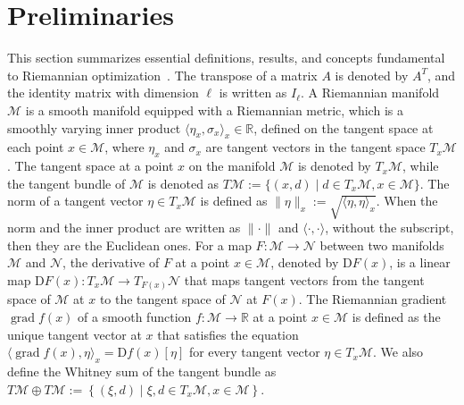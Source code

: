 \documentclass[pdflatex,sn-mathphys-num]{sn-jnl}%
\theoremstyle{definition} %
\theoremstyle{remark} %
\begin{document}
\section{Preliminaries}\label{sec: preliminaries}

This section summarizes essential definitions, results, and concepts fundamental to Riemannian optimization~\cite{sato_riemannian_2021}.
The transpose of a matrix $A$ is denoted by $A^T$, and the identity matrix with dimension $\ell$ is written as $I_\ell$.
A Riemannian manifold \(\mathcal{M}\) is a smooth manifold equipped with a Riemannian metric, which is a smoothly varying inner product \(\langle \eta_x, \sigma_x \rangle_x \in \mathbb{R}\), defined on the tangent space at each point \(x \in \mathcal{M}\), where \(\eta_x\) and \(\sigma_x\) are tangent vectors in the tangent space \(T_x \mathcal{M}\).
The tangent space at a point \(x\) on the manifold \(\mathcal{M}\) is denoted by \(T_x \mathcal{M}\), while the tangent bundle of \(\mathcal{M}\) is denoted as \(T\mathcal{M} := \{(x, d) \mid d \in T_x \mathcal{M}, x \in \mathcal{M}\}\).
The norm of a tangent vector \(\eta \in T_x \mathcal{M}\) is defined as \(\|\eta\|_x := \sqrt{\langle\eta, \eta\rangle_x}\).
When the norm and the inner product are written as \( \|\cdot\| \) and $\langle \cdot, \cdot \rangle$,
without the subscript, then they are the Euclidean ones.
For a map \(F \colon \mathcal{M} \rightarrow \mathcal{N}\) between two manifolds \(\mathcal{M}\) and \(\mathcal{N}\), the derivative of \(F\) at a point \(x \in \mathcal{M}\), denoted by \(\mathrm{D} F(x)\), is a linear map \(\mathrm{D} F(x) \colon T_x \mathcal{M} \rightarrow T_{F(x)} \mathcal{N}\) that maps tangent vectors from the tangent space of \(\mathcal{M}\) at \(x\) to the tangent space of \(\mathcal{N}\) at \(F(x)\).
The Riemannian gradient \(\operatorname{grad} f(x)\) of a smooth function \(f \colon \mathcal{M} \rightarrow \mathbb{R}\) at a point \(x \in \mathcal{M}\) is defined as the unique tangent vector at \(x\) that satisfies the equation \(\langle\operatorname{grad} f(x), \eta\rangle_x = \mathrm{D} f(x)[\eta]\) for every tangent vector \(\eta \in T_x \mathcal{M}\).
We also define the Whitney sum of the tangent bundle as \(T \mathcal{M} \oplus T \mathcal{M} := \left\{(\xi, d) \mid \xi, d \in T_x \mathcal{M}, x \in \mathcal{M}\right\}\).
\end{document}
